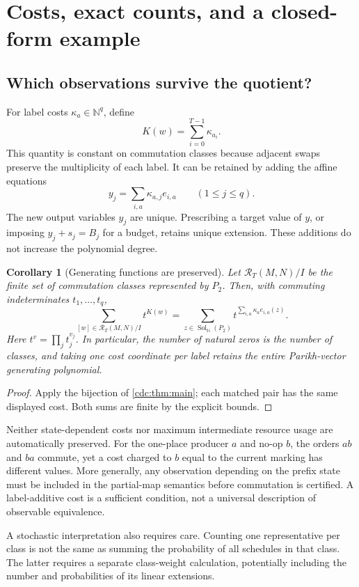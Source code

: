 \documentclass[11pt,a4paper]{article}
\newtheorem{corollary}[corollary]{Corollary}
\theoremstyle{definition}
\theoremstyle{remark}
\newcommand{\N}{\mathbb N}
\newcommand{\Sol}{\operatorname{Sol}_{\N}}
\newcommand{\srctag}[1]{\texorpdfstring{\hspace{0.5em}{\normalfont\small\color{accent}[#1]}}{ [#1]}}
\begin{document}
\section{Costs, exact counts, and a closed-form example\srctag{05}}
\label{cdc:sec:cost}
\subsection{Which observations survive the quotient?}
For label costs $\kappa_a\in\N^q$, define
\[
K(w)=\sum_{i=0}^{T-1}\kappa_{a_i}.
\]
This quantity is constant on commutation classes because adjacent swaps preserve the multiplicity of each label. It can be retained by adding the affine equations
\begin{equation}\label{cdc:eq:cost}
y_j=\sum_{i,a}\kappa_{a,j}e_{i,a}\qquad(1\le j\le q).
\end{equation}
The new output variables $y_j$ are unique. Prescribing a target value of $y$, or imposing $y_j+s_j=B_j$ for a budget, retains unique extension. These additions do not increase the polynomial degree.

\begin{corollary}[Generating functions are preserved]\label{cdc:cor:weighted}
Let $\mathcal R_T(M,N)/I$ be the finite set of commutation classes represented by $P_2$. Then, with commuting indeterminates $t_1,\ldots,t_q$,
\[
\sum_{[w]\in\mathcal R_T(M,N)/I}t^{K(w)}
=\sum_{z\in\Sol(P_2)}t^{\sum_{i,a}\kappa_a e_{i,a}(z)}.
\]
Here $t^v=\prod_jt_j^{v_j}$. In particular, the number of natural zeros is the number of classes, and taking one cost coordinate per label retains the entire Parikh-vector generating polynomial.
\end{corollary}
\begin{proof}
Apply the bijection of \cref{cdc:thm:main}; each matched pair has the same displayed cost. Both sums are finite by the explicit bounds.
\end{proof}

Neither state-dependent costs nor maximum intermediate resource usage are automatically preserved. For the one-place producer $a$ and no-op $b$, the orders $ab$ and $ba$ commute, yet a cost charged to $b$ equal to the current marking has different values. More generally, any observation depending on the prefix state must be included in the partial-map semantics before commutation is certified. A label-additive cost is a sufficient condition, not a universal description of observable equivalence.

A stochastic interpretation also requires care. Counting one representative per class is not the same as summing the probability of all schedules in that class. The latter requires a separate class-weight calculation, potentially including the number and probabilities of its linear extensions.
\end{document}
